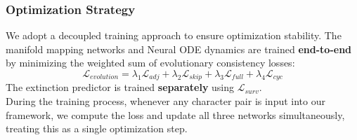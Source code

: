 \documentclass{article}
\begin{document}




\subsubsection{Optimization Strategy}

We adopt a decoupled training approach to ensure optimization stability. The manifold mapping networks and Neural ODE dynamics are trained \textbf{end-to-end} by minimizing the weighted sum of evolutionary consistency losses:
\begin{equation}
    \mathcal{L}_{evolution} = \lambda_{1}\mathcal{L}_{adj}+\lambda_{2}\mathcal{L}_{skip}+\lambda_{3}\mathcal{L}_{full}+\lambda_{4}\mathcal{L}_{cyc}
\end{equation}
The extinction predictor is trained \textbf{separately} using $\mathcal{L}_{surv}$. \\
During the training process, whenever any character pair is input into our framework, we compute the loss and update all three networks simultaneously, treating this as a single optimization step.
\end{document}
